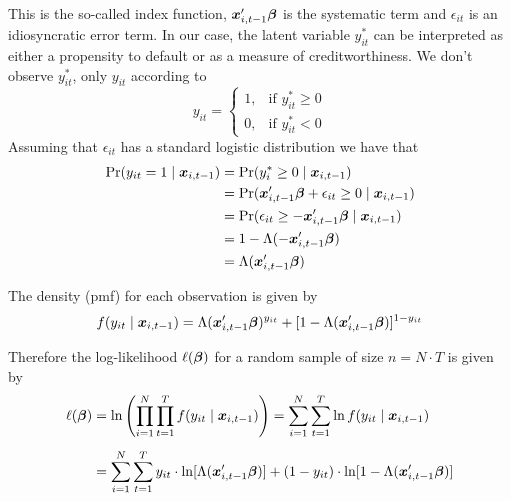 This is the so-called index function, $\bm x_{i,t-1}'\bm \beta$ is the systematic term and $\epsilon_{it}$ is an idiosyncratic error term. In our case, the latent variable $y^*_{it}$ can be interpreted as either a propensity to default or as a measure of creditworthiness. We don't observe $y^*_{it}$, only $y_{it}$ according to
\begin{equation}
y_{it} = \begin{cases} 
      1, & \text{if } y^*_{it} \geq 0 \\
      0, & \text{if } y^*_{it} < 0 
   \end{cases}
\end{equation}
Assuming that $\epsilon_{it}$ has a standard logistic distribution we have that
\begin{align}
\label{eq:model}
\begin{split}
\Pr(y_{it} = 1 \mid \bm x_{i,t-1}) &= \Pr(y^*_i \geq 0 \mid \bm x_{i,t-1}) \\
&= \Pr(\bm x_{i,t-1}'\bm \beta + \epsilon_{it} \geq 0 \mid \bm x_{i,t-1}) \\
&= \Pr(\epsilon_{it} \geq - \bm x_{i,t-1}'\bm \beta \mid \bm x_{i,t-1}) \\
&= 1 - \Lambda(-\bm x_{i,t-1}'\bm \beta) \\
&= \Lambda(\bm x_{i,t-1}' \bm \beta) \\
\end{split}
\end{align}

The density (pmf) for each observation is given by
\begin{equation*}
f(y_{it} \mid \bm x_{i,t-1}) = \Lambda(\bm x_{i,t-1}' \bm \beta)^{y_{it}} + [1 - \Lambda(\bm x_{i,t-1}' \bm \beta)]^{1 - y_{it}}
\end{equation*}


Therefore the log-likelihood $\ell(\bm \beta)$ for a random sample of size $n = N \cdot T$ is given by
\begin{align}
\label{eq:log-likelihood}
\begin{split}
\ell(\bm \beta) &= \ln{\left(\prod_{i=1}^N \prod_{t=1}^T{f(y_{it} \mid \bm x_{i,t-1})}\right)} = \sum_{i=1}^N\sum_{t=1}^T{\ln{f(y_{it} \mid \bm x_{i,t-1})}} \\[5pt]
&= \sum_{i=1}^N\sum_{t=1}^T{y_{it} \cdot \ln [\Lambda(\bm x_{i,t-1}' \bm \beta)] + (1 - y_{it}) \cdot \ln [1 - \Lambda(\bm x_{i,t-1}' \bm \beta)]}
\end{split}
\end{align}

